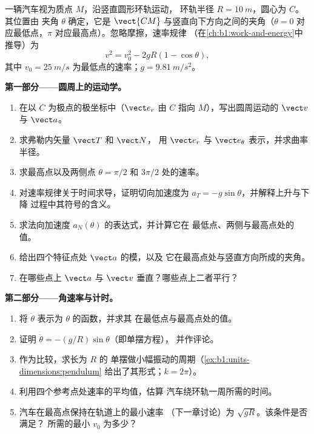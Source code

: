 \begin{problem}
\label{pb:b1:point-kinematics:1}
一辆汽车视为质点 $M$，沿竖直圆形环轨运动，
环轨半径 $R = \qty{10}{m}$，圆心为 $C$。其位置由
夹角 $\theta$ 确定，它是 $\vect{CM}$ 与竖直向下方向之间的夹角（$\theta =
0$ 对应最低点，$\pi$ 对应最高点）。忽略摩擦，速率规律
（在\cref{ch:b1:work-and-energy}中推导）为
\[
v^2 = v_0^2 - 2gR(1 - \cos\theta),
\]
其中 $v_0 = \qty{25}{m/s}$ 为最低点的速率；$g = \qty{9.81}{m/s^2}$。

\medskip
\noindent\textbf{第一部分——圆周上的运动学。}
\begin{enumerate}
  \item 在以 $C$ 为极点的极坐标中（$\vect e_r$ 由 $C$
        指向 $M$），写出圆周运动的 $\vect v$ 与 $\vect a$。
  \item 求弗勒内矢量 $\vect T$ 和 $\vect N$，
        用 $\vect e_r$ 与 $\vect e_\theta$ 表示，并求曲率半径。
  \item 求最高点以及两侧点
        $\theta = \pi/2$ 和 $3\pi/2$ 处的速率。
  \item 对速率规律关于时间求导，证明切向加速度为
        $a_T = -g\sin\theta$，并解释上升与下降
        过程中其符号的含义。
  \item 求法向加速度 $a_N(\theta)$ 的表达式，并计算它在
        最低点、两侧与最高点处的值。
  \item 给出四个特征点处 $\vect a$ 的模，以及
        它在最高点处与竖直方向所成的夹角。
  \item 在哪些点上 $\vect a$ 与 $\vect v$ 垂直？哪些点上二者平行？
\end{enumerate}

\medskip
\noindent\textbf{第二部分——角速率与计时。}
\begin{enumerate}[resume]
  \item 将 $\dot\theta$ 表示为 $\theta$ 的函数，并求其
        在最低点与最高点处的值。
  \item 证明 $\ddot\theta = -(g/R)\sin\theta$（即单摆方程），
        并作评论。
  \item 作为比较，求长为 $R$ 的
        单摆做小幅振动的周期（\cref{ex:b1:units-dimensions:pendulum}
        给出了其形式；$k = 2\pi$）。
  \item 利用四个参考点处速率的平均值，估算
        汽车绕环轨一周所需的时间。
  \item 汽车在最高点保持在轨道上的最小速率
        （下一章讨论）为 $\sqrt{gR}$。该条件是否满足？
        所需的最小 $v_0$ 为多少？
\end{enumerate}


\end{problem}
